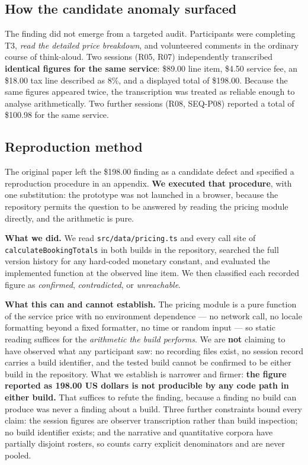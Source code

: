 \documentclass[conference]{IEEEtran}
\begin{document}
\subsection{How the candidate anomaly surfaced}

The finding did not emerge from a targeted audit. Participants were completing T3, \emph{read the
detailed price breakdown}, and volunteered comments in the ordinary course of think-aloud. Two sessions
(R05, R07) independently transcribed \textbf{identical figures for the same service}: \$89.00 line item,
\$4.50 service fee, an \$18.00 tax line described as 8\%, and a displayed total of \$198.00. Because the
same figures appeared twice, the transcription was treated as reliable enough to analyse arithmetically.
Two further sessions (R08, SEQ-P08) reported a total of \$100.98 for the same service.

\subsection{Reproduction method}

The original paper left the \$198.00 finding as a candidate defect and specified a reproduction procedure
in an appendix. \textbf{We executed that procedure}, with one substitution: the prototype was not launched
in a browser, because the repository permits the question to be answered by reading the pricing module
directly, and the arithmetic is pure.

\textbf{What we did.} We read \texttt{src/data/pricing.ts} and every call site of
\texttt{calculateBookingTotals} in both builds in the repository, searched the full version history for
any hard-coded monetary constant, and evaluated the implemented function at the observed line item. We
then classified each recorded figure as \emph{confirmed}, \emph{contradicted}, or \emph{unreachable}.

\textbf{What this can and cannot establish.} The pricing module is a pure function of the service price
with no environment dependence --- no network call, no locale formatting beyond a fixed formatter, no
time or random input --- so static reading suffices for the \emph{arithmetic the build performs}. We are
\textbf{not} claiming to have observed what any participant saw: no recording files exist, no session
record carries a build identifier, and the tested build cannot be confirmed to be either build in the
repository. What we establish is narrower and firmer: \textbf{the figure reported as 198.00 US dollars
is not producible by any code path in either build.} That suffices to refute the finding, because a
finding no build can produce was never a finding about a build. Three further constraints bound every
claim: the session figures are observer transcription rather than build inspection; no build identifier
exists; and the narrative and quantitative corpora have partially disjoint rosters, so counts carry
explicit denominators and are never pooled.
\end{document}

